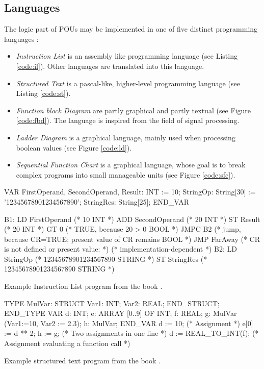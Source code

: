 \subsection{Languages}
\label{sub:iec-lang}
The logic part of POUs may be implemented in one of five distinct programming languages \cite{johnIEC611313Programming2010}:
\begin{itemize}
	\item \emph{Instruction List} is an assembly like programming language (see Listing \ref{code:il}). Other languages are translated into this language.
	\item \emph{Structured Text} is a pascal-like, higher-level programming language (see Listing \ref{code:st}).
	\item \emph{Function block Diagram} are partly graphical and partly textual (see Figure \ref{code:fbd}). The language is inspired from the field of signal processing. 
	\item \emph{Ladder Diagram} is a graphical language, mainly used when processing boolean values (see Figure \ref{code:ld}).
	\item \emph{Sequential Function Chart} is a graphical language, whose goal is to break complex programs into small manageable units (see Figure \ref{code:sfc}). 
\end{itemize}


\begin{program}[h!]
	\begin{GenericCode}
		VAR
		FirstOperand, SecondOperand, Result: INT := 10;
		StringOp: String[30] := '12345678901234567890';
		StringRes: String[25];
		END_VAR
		
		B1:	LD FirstOperand (* 10 {INT} *)
		ADD SecondOperand (* 20 {INT} *)
		ST Result (* 20 {INT} *)
		GT 0 (* TRUE, because 20 > 0 {BOOL} *)
		JMPC B2
		(* jump, because CR=TRUE; present value of CR remains {BOOL} *)
		JMP FarAway (* CR is not defined or present value: *)
		(* implementation-dependent *)
		B2: LD StringOp (* 12345678901234567890 {STRING} *)
		ST StringRes (* 12345678901234567890 {STRING} *)\end{GenericCode}
	\caption{Example Instruction List program from the book \cite{johnIEC611313Programming2010}.}
	\label{code:il}
\end{program}

\begin{program}[h!]
	\begin{GenericCode}
		TYPE MulVar: STRUCT Var1: INT; Var2: REAL; END_STRUCT; END_TYPE
		VAR d: INT;
		e: ARRAY [0..9] OF INT; 
		f: REAL;
		g: MulVar (Var1:=10, Var2 := 2.3); 
		h: MulVar;
		END_VAR
		d := 10; (* Assignment *)
		e[0] := d ** 2;   h  := g; (* Two assignments in one line *)
		d := REAL_TO_INT(f); (* Assignment evaluating a function call *)\end{GenericCode}
	\caption{Example structured text program from the book \cite{johnIEC611313Programming2010}.}
	\label{code:st}
\end{program}

